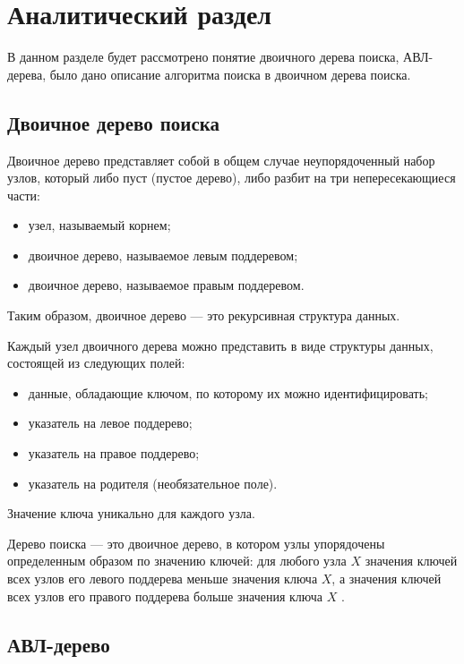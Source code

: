 \chapter{Аналитический раздел}

В данном разделе будет рассмотрено понятие двоичного дерева поиска, АВЛ-дерева, было дано описание алгоритма поиска в двоичном дерева поиска.

\section{Двоичное дерево поиска}

Двоичное дерево представляет собой в общем случае неупорядоченный набор узлов, который либо пуст (пустое дерево), либо разбит на три непересекающиеся части:

\begin{itemize}[label*=--]
	\item узел, называемый корнем;
	\item двоичное дерево, называемое левым поддеревом;
	\item двоичное дерево, называемое правым поддеревом.
\end{itemize}

Таким образом, двоичное дерево --- это рекурсивная структура данных.

Каждый узел двоичного дерева можно представить в виде структуры данных, состоящей из следующих полей:

\begin{itemize}[label*=--]
	\item данные, обладающие ключом, по которому их можно идентифицировать;
	\item указатель на левое поддерево;
	\item указатель на правое поддерево;
	\item указатель на родителя (необязательное поле).
\end{itemize}

Значение ключа уникально для каждого узла.

Дерево поиска --- это двоичное дерево, в котором узлы упорядочены определенным образом по значению ключей: для любого узла $X$ значения ключей всех узлов его левого поддерева меньше значения ключа $X$, а значения ключей всех узлов его правого поддерева больше значения ключа $X$ \cite{info_book_bst}.

\section{АВЛ-дерево}

